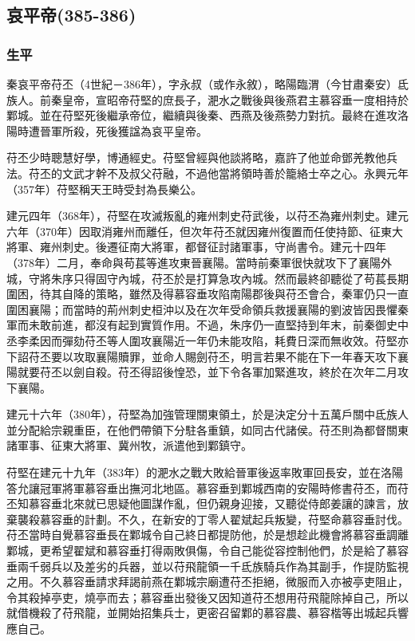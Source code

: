 
\subsection{哀平帝\tiny(385-386)}

\subsubsection{生平}

秦哀平帝苻丕（4世紀－386年），字永叔（或作永敘），略陽臨渭（今甘肅秦安）氐族人。前秦皇帝，宣昭帝苻堅的庶長子，淝水之戰後與後燕君主慕容垂一度相持於鄴城。並在苻堅死後繼承帝位，繼續與後秦、西燕及後燕勢力對抗。最終在進攻洛陽時遭晉軍所殺，死後獲諡為哀平皇帝。

苻丕少時聰慧好學，博通經史。苻堅曾經與他談將略，嘉許了他並命鄧羌教他兵法。苻丕的文武才幹不及叔父苻融，不過他當將領時善於籠絡士卒之心。永興元年（357年）苻堅稱天王時受封為長樂公。

建元四年（368年），苻堅在攻滅叛亂的雍州刺史苻武後，以苻丕為雍州刺史。建元六年（370年）因取消雍州而離任，但次年苻丕就因雍州復置而任使持節、征東大將軍、雍州刺史。後遷征南大將軍，都督征討諸軍事，守尚書令。建元十四年（378年）二月，奉命與苟萇等進攻東晉襄陽。當時前秦軍很快就攻下了襄陽外城，守將朱序只得固守內城，苻丕於是打算急攻內城。然而最終卻聽從了苟萇長期圍困，待其自降的策略，雖然及得慕容垂攻陷南陽郡後與苻丕會合，秦軍仍只一直圍困襄陽；而當時的荊州刺史桓沖以及在次年受命領兵救援襄陽的劉波皆因畏懼秦軍而未敢前進，都沒有起到實質作用。不過，朱序仍一直堅持到年末，前秦御史中丞李柔因而彈劾苻丕等人圍攻襄陽近一年仍未能攻陷，耗費日深而無收效。苻堅亦下詔苻丕要以攻取襄陽贖罪，並命人賜劍苻丕，明言若果不能在下一年春天攻下襄陽就要苻丕以劍自殺。苻丕得詔後惶恐，並下令各軍加緊進攻，終於在次年二月攻下襄陽。

建元十六年（380年），苻堅為加強管理關東領土，於是決定分十五萬戶關中氐族人並分配給宗親重臣，在他們帶領下分駐各重鎮，如同古代諸侯。苻丕則為都督關東諸軍事、征東大將軍、冀州牧，派遣他到鄴鎮守。

苻堅在建元十九年（383年）的淝水之戰大敗給晉軍後返率敗軍回長安，並在洛陽答允讓冠軍將軍慕容垂出撫河北地區。慕容垂到鄴城西南的安陽時修書苻丕，而苻丕知慕容垂北來就已思疑他圖謀作亂，但仍親身迎接，又聽從侍郎姜讓的諫言，放棄襲殺慕容垂的計劃。不久，在新安的丁零人翟斌起兵叛變，苻堅命慕容垂討伐。苻丕當時自覺慕容垂長在鄴城令自己終日都提防他，於是想趁此機會將慕容垂調離鄴城，更希望翟斌和慕容垂打得兩敗俱傷，令自己能從容控制他們，於是給了慕容垂兩千弱兵以及差劣的兵器，並以苻飛龍領一千氐族騎兵作為其副手，作提防監視之用。不久慕容垂請求拜謁前燕在鄴城宗廟遭苻丕拒絕，微服而入亦被亭吏阻止，令其殺掉亭吏，燒亭而去；慕容垂出發後又因知道苻丕想用苻飛龍除掉自己，所以就借機殺了苻飛龍，並開始招集兵士，更密召留鄴的慕容農、慕容楷等出城起兵響應自己。

